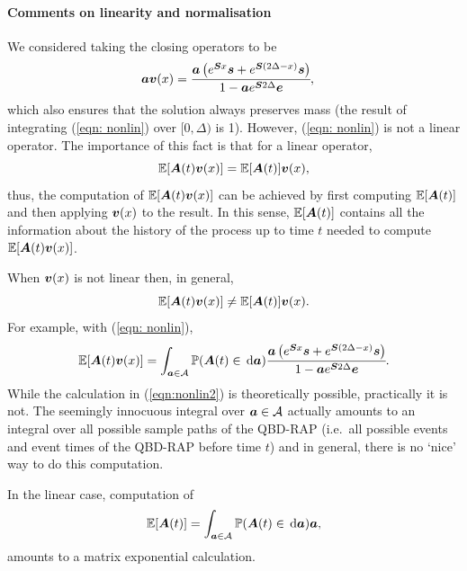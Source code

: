 	\paragraph{Comments on linearity and normalisation}
	We considered taking the closing operators to be 
	\begin{align}
		\boldsymbol a {\boldsymbol v}(x) &= \cfrac{\boldsymbol a \left(e^{ \boldsymbol{S}x} \boldsymbol s + e^{ \boldsymbol{S}(2\Delta-x)} \boldsymbol s\right)}{1-\boldsymbol a e^{\boldsymbol S 2\Delta}\boldsymbol e},\label{eqn: nonlin}
	\end{align}
	which also ensures that the solution always preserves mass (the result of integrating (\ref{eqn: nonlin}) over \([0,\Delta)\) is 1). However, (\ref{eqn: nonlin}) is not a linear operator. The importance of this fact is that for a linear operator, 
	\[\mathbb E[\boldsymbol A(t) {\boldsymbol v}(x)] = \mathbb E[\boldsymbol A(t)]{\boldsymbol v}(x),\]
	thus, the computation of \(\mathbb E[\boldsymbol A(t) {\boldsymbol v}(x)]\) can be achieved by first computing \(\mathbb E[\boldsymbol A(t)]\) and then applying \({\boldsymbol v}(x)\) to the result. In this sense, \(\mathbb E[\boldsymbol A(t)]\) contains all the information about the history of the process up to time \(t\) needed to compute \(\mathbb E[\boldsymbol A(t) {\boldsymbol v}(x)]\). %

	When \({\boldsymbol v}(x)\) is not linear then, in general, 
	\[\mathbb E[\boldsymbol A(t) {\boldsymbol v}(x)] \neq \mathbb E[\boldsymbol A(t)]{\boldsymbol v}(x).\]
	For example, with (\ref{eqn: nonlin}), 
	\begin{align}
		\mathbb E[\boldsymbol A(t) {\boldsymbol v}(x)] = \int_{\boldsymbol a \in\mathcal A} \mathbb P(\boldsymbol A(t) \in{}\, \mathrm{d} \boldsymbol a) \cfrac{\boldsymbol a \left(e^{ \boldsymbol{S}x} \boldsymbol s + e^{ \boldsymbol{S}(2\Delta-x)} \boldsymbol s\right)}{1-\boldsymbol a e^{\boldsymbol S 2\Delta}\boldsymbol e}.\label{eqn:nonlin2}
	\end{align}
	While the calculation in (\ref{eqn:nonlin2}) is theoretically possible, practically it is not. The seemingly innocuous integral over \(\boldsymbol a \in\mathcal A\) actually amounts to an integral over all possible sample paths of the QBD-RAP (i.e.~all possible events and event times of the QBD-RAP before time \(t\)) and in general, there is no `nice' way to do this computation. 
	
	In the linear case, computation of
	\[\mathbb E[\boldsymbol A(t)] = \int_{\boldsymbol a\in\mathcal A} \mathbb P(\boldsymbol A(t) \in{}\, \mathrm{d} \boldsymbol a) \boldsymbol a,\]
	amounts to a matrix exponential calculation. 

